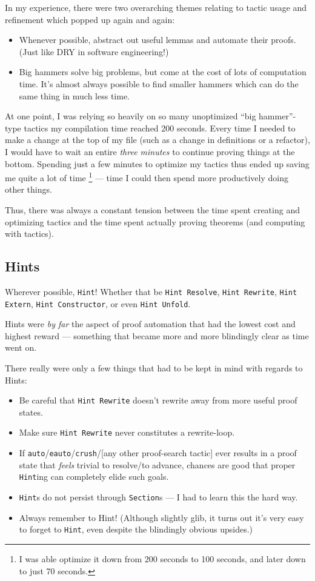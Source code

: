\documentclass[acmsmall, authorversion, nonacm, overload]{acmart}
\begin{document}
In my experience, there were two overarching themes relating to tactic usage and refinement
which popped up again and again:
\begin{itemize}
\item Whenever possible, abstract out useful lemmas and automate their proofs.
  (Just like DRY in software engineering!)
\item Big hammers solve big problems, but come at the cost of lots of computation time.
  It's almost always possible to find smaller hammers which can do the same thing in much less time.
\end{itemize}

At one point, I was relying so heavily on so many unoptimized ``big hammer''-type tactics
my compilation time reached 200 seconds.
Every time I needed to make a change at the top of my file (such as a change in definitions or a refactor),
I would have to wait an entire \emph{three minutes} to continue proving things at the bottom.
Spending just a few minutes to optimize my tactics thus ended up saving me quite a lot of time
\footnote{I was able optimize it down from 200 seconds to 100 seconds, and later down to just 70 seconds.}
--- time I could then spend more productively doing other things.

Thus, there was always a constant tension between
the time spent creating and optimizing tactics and the time spent actually proving theorems
(and computing with tactics).

\subsection{Hints}
Wherever possible, \verb|Hint|!
Whether that be \verb|Hint Resolve|, \verb|Hint Rewrite|, \verb|Hint Extern|,
\verb|Hint Constructor|,
or even \verb|Hint Unfold|.

Hints were \emph{by far} the aspect of proof automation that had the lowest cost and highest reward ---
something that became more and more blindingly clear as time went on.

There really were only a few things that had to be kept in mind with regards to Hints:
\begin{itemize}
\item Be careful that \verb|Hint Rewrite| doesn't rewrite away from more useful proof states.
\item Make sure \verb|Hint Rewrite| never constitutes a rewrite-loop.
\item If \texttt{auto}/\texttt{eauto}/\verb|crush|/[any other proof-search tactic]
  ever results in a proof state that \emph{feels} trivial to resolve/to advance,
  chances are good that proper \verb|Hint|ing can completely elide such goals.
\item \verb|Hint|s do not persist through \verb|Section|s --- I had to learn this the hard way.
\item Always remember to Hint!
  (Although slightly glib, it turns out it's very easy to forget to \verb|Hint|,
  even despite the blindingly obvious upsides.)
\end{itemize}
\end{document}
